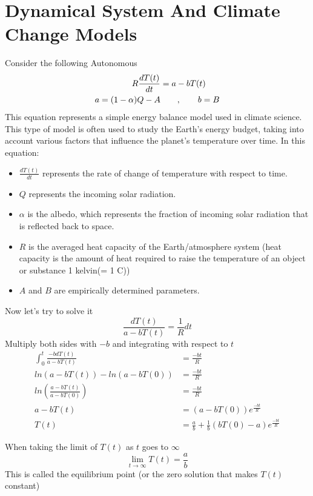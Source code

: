 \section{Dynamical System And Climate Change Models}
Consider the following Autonomous
\begin{align*}
    R \frac{dT(t)}{dt} & = a - bT(t)
    \\
    a = (1-\alpha)Q-A  & \quad\quad,\quad\quad b = B
\end{align*}
This equation represents a simple energy balance model used in climate science.
This type of model is often used to study the Earth's energy budget,
taking into account various factors that influence the planet's temperature over time.
In this equation:
\begin{itemize}
    \item $\displaystyle \frac{dT(t)}{dt}$ represents the rate of change of temperature with respect to time.
    \item $Q$ represents the incoming solar radiation.
    \item $\alpha$ is the albedo, which represents the fraction of incoming solar radiation that is reflected back to space.
    \item $R$ is the averaged heat capacity of the Earth/atmosphere
          system (heat capacity is the amount of heat required to raise the temperature of an object or substance 1 kelvin(= 1 C))
    \item $A$ and $B$ are empirically determined parameters.
\end{itemize}
Now let's try to solve it
\[
    \frac{dT(t)}{a - bT(t)} = \frac{1}{R} dt
\]
Multiply both sides with $-b$ and integrating with respect to $t$
\begin{align*}
    \int_{0}^{t} \frac{-b dT(t)}{a - bT(t)}     & = \frac{-bt}{R}
    \\
    ln(a - bT(t)) - ln(a - bT(0))               & = \frac{-bt}{R}
    \\
    ln \left(\frac{a - bT(t)}{a - bT(0)}\right) & = \frac{-bt}{R}
    \\
    a - bT(t)                                   & = (a - bT(0))e^{\frac{-bt}{R}}
    \\
    T(t)                                        & = \frac{a}{b} + \frac{1}{b}(bT(0)-a)e^{\frac{-bt}{R}}
\end{align*}

When taking the limit of $T(t)$ as $t$ goes to $\infty$
\[
    \lim_{t \to \infty} T(t) = \frac{a}{b}
\]
This is called the equilibrium point (or the zero solution that makes $T(t)$ constant)

